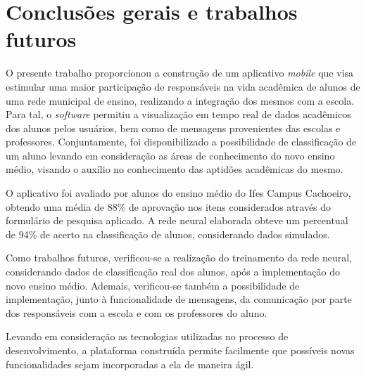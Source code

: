 \chapter{\textbf{Conclusões gerais e trabalhos futuros}} %

O presente trabalho proporcionou a construção de um aplicativo \textit{mobile} que visa estimular uma maior participação de responsáveis na vida acadêmica de alunos de uma rede municipal de ensino, realizando a integração dos mesmos com a escola. Para tal, o \textit{software} permitiu a visualização em tempo real de dados acadêmicos dos alunos pelos usuários, bem como de mensagens provenientes das escolas e professores. Conjuntamente, foi disponibilizado a possibilidade de classificação de um aluno levando em consideração as áreas de conhecimento do novo ensino médio, visando o auxílio no conhecimento das aptidões acadêmicas do mesmo.

O aplicativo foi avaliado por alunos do ensino médio do Ifes Campus Cachoeiro, obtendo uma média de 88\% de aprovação nos itens considerados através do formulário de pesquisa aplicado. A rede neural elaborada obteve um percentual de 94\% de acerto na classificação de alunos, considerando dados simulados.

Como trabalhos futuros, verificou-se a realização do treinamento da rede neural, considerando dados de classificação real dos alunos, após a implementação do novo ensino médio. Ademais, verificou-se também a possibilidade de implementação, junto à funcionalidade de mensagens, da comunicação por parte dos responsáveis com a escola e com os professores do aluno.

Levando em consideração as tecnologias utilizadas no processo de desenvolvimento, a plataforma construída permite facilmente que possíveis novas funcionalidades sejam incorporadas a ela de maneira ágil.